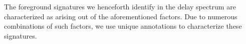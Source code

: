 \documentclass[preprint2,iop,numberedappendix]{emulateapj}
\begin{document}
The foreground signatures we henceforth identify in the delay spectrum are characterized as arising out of the aforementioned factors. Due to numerous combinations of such factors, we use unique annotations to characterize these signatures.

\end{document}
